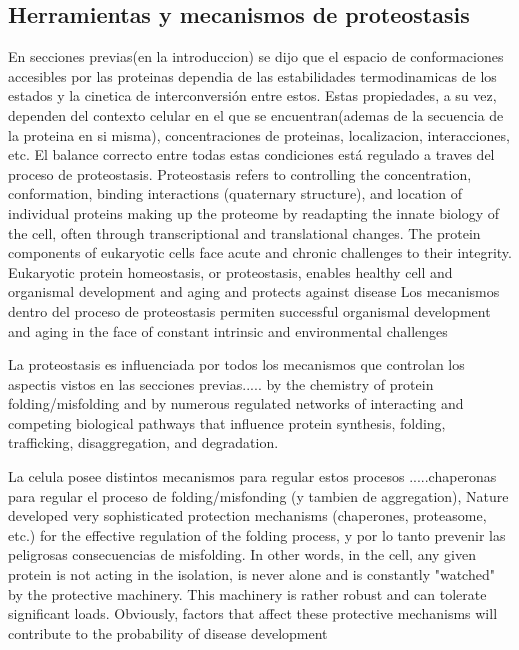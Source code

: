 \subsection{Herramientas y mecanismos de proteostasis}
En secciones previas(en la introduccion) se dijo que el espacio de conformaciones accesibles por las proteinas dependia de las estabilidades termodinamicas de los estados y la cinetica de interconversión entre estos. 
Estas propiedades, a su vez, dependen del contexto celular en el que se encuentran(ademas de la secuencia de la proteina en si misma), concentraciones de proteinas, localizacion, interacciones, etc.
El balance correcto entre todas estas condiciones está regulado a traves del proceso de proteostasis.
Proteostasis refers to controlling the concentration, conformation, binding interactions (quaternary structure), and location of individual proteins making up the proteome by readapting the innate biology of the cell, 
often through transcriptional and translational changes.
The protein components of eukaryotic cells face acute and chronic challenges to their integrity. Eukaryotic protein homeostasis, or proteostasis, enables healthy cell and organismal development and aging and protects against disease
Los mecanismos dentro del proceso de proteostasis permiten successful organismal development and aging in the face of constant intrinsic and environmental challenges %

La proteostasis es influenciada por todos los mecanismos que controlan los aspectis vistos en las secciones previas..... by the chemistry of protein folding/misfolding and by numerous regulated networks of interacting and competing biological pathways 
that influence protein synthesis, folding, trafficking, disaggregation, and degradation.

La celula posee distintos mecanismos para regular estos procesos .....chaperonas para regular el proceso de folding/misfonding (y tambien de aggregation), 
Nature developed very sophisticated protection mechanisms (chaperones, proteasome, etc.) for the effective regulation of the folding process, y por lo tanto prevenir las peligrosas consecuencias de misfolding. 
In other words, in the cell, any given protein is not acting in the isolation, is never alone and is
constantly "watched" by the protective machinery. This machinery is rather robust and can
tolerate significant loads. Obviously, factors that affect these protective mechanisms will
contribute to the probability of disease development


